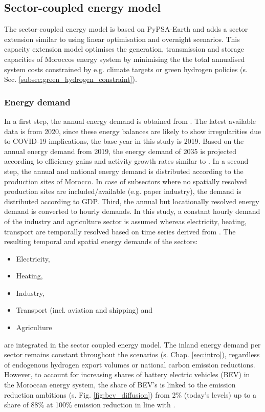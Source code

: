 \subsection{Sector-coupled energy model}
\label{subsec:moroccan_model}
The sector-coupled energy model is based on PyPSA-Earth \cite{Parzen2023} and adds a sector extension similar to \cite{Brown2018a} using linear optimisation and overnight scenarios. This capacity extension model optimises the generation, transmission and storage capacities of Moroccos energy system by minimising the the total annualised system costs constrained by e.g. climate targets or green hydrogen policies (s. Sec. \ref{subsec:green_hydrogen_constraint}).

\subsubsection{Energy demand}
In a first step, the annual energy demand is obtained from \cite{unstats2023}. The latest available data is from 2020, since these energy balances are likely to show irregularities due to COVID-19 implications, the base year in this study is 2019. Based on the annual energy demand from 2019, the energy demand of 2035 is projected according to efficiency gains and activity growth rates similar to \cite{Muller2023}.
In a second step, the annual and national energy demand is distributed according to the production sites of Morocco. %
In case of subsectors where no spatially resolved production sites are included/available (e.g. paper industry), the demand is distributed according to GDP. %
Third, the annual but locationally resolved energy demand is converted to hourly demands. In this study, a constant hourly demand of the industry and agriculture sector is assumed whereas electricity, heating, transport are temporally resolved based on time series derived from \cite{Brown2018a}. The resulting temporal and spatial energy demands of the sectors:
\begin{itemize}
    \item Electricity,
    \item Heating,
    \item Industry,
    \item Transport (incl. aviation and shipping) and
    \item Agriculture
\end{itemize}
are integrated in the sector coupled energy model. The inland energy demand per sector remains constant throughout the scenarios (s. Chap. \ref{sec:intro}), regardless of endogenous hydrogen export volumes or national carbon emission reductions. However, to account for increasing shares of battery electric vehicles (BEV) in the Moroccan energy system, the share of BEV's is linked to the emission reduction ambitions (s. Fig. \ref{fig:bev_diffusion}) from 2\% (today's levels) up to a share of 88\% at 100\% emission reduction in line with \cite{Rim2021}.


